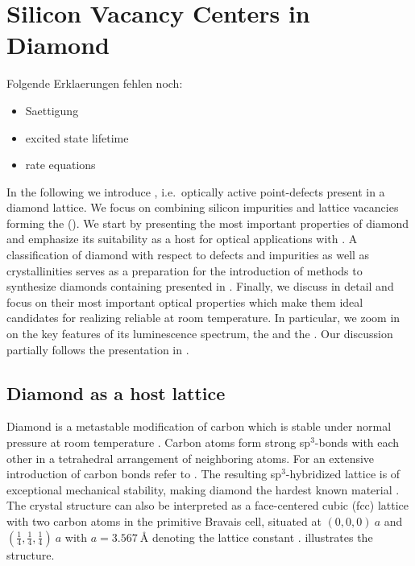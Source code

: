 
\chapter{Silicon Vacancy Centers in Diamond}	\label{ch::sivs}

\begin{remark}
Folgende Erklaerungen fehlen noch:
\begin{itemize}
  \item Saettigung
  \item excited state lifetime
  \item rate equations
\end{itemize}
\end{remark}

  In the following we introduce \ccs, i.e.\ optically active point-defects present in a diamond lattice.
  We focus on \ccs combining silicon impurities and lattice vacancies forming the \sivc (\siv).
  We start by presenting the most important properties of diamond and emphasize its suitability as a host for optical applications with \ccs.
  A classification of diamond with respect to defects and impurities as well as crystallinities serves as a preparation for the introduction of methods to synthesize diamonds containing \sivs presented in .
  Finally, we discuss \sivs in detail and focus on their most important optical properties which make them ideal candidates for realizing reliable \spss at room temperature.
  In particular, we zoom in on the key features of its luminescence spectrum, the \zpl and the \psb.
  Our discussion partially follows the presentation in \cite{Riedrich-moller2014, Neu2012, BeckerMasterThesis, Steinmetz2011}.

\section{Diamond as a host lattice}

  Diamond is a metastable modification of carbon which is stable under normal pressure at room temperature \cite{Bundy1989}. Carbon atoms form strong sp$^3$-bonds with each other in a tetrahedral arrangement of neighboring atoms. For an extensive introduction of carbon bonds refer to . The resulting sp$^3$-hybridized lattice is of exceptional mechanical stability, making diamond the hardest known material \cite{telling2000theoretical}.
  The crystal structure can also be interpreted as a face-centered cubic (fcc) lattice with two carbon atoms in the primitive Bravais cell, situated at $(0,0,0) \ a$ and $ (\frac{1}{4}, \frac{1}{4}, \frac{1}{4}) \ a$ with $a = \SI{3.567}{\angstrom}$ denoting the lattice constant \cite{Saotome1998}.  illustrates the structure.

